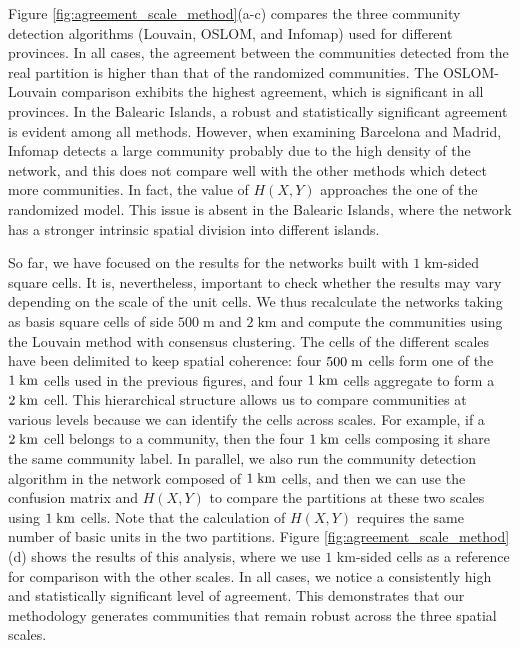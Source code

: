 Figure \ref{fig:agreement_scale_method}(a-c) compares the three community detection algorithms (Louvain, OSLOM, and Infomap) used for different provinces. In all cases, the agreement between the communities detected from the real partition is higher than that of the randomized communities. The OSLOM-Louvain comparison exhibits the highest agreement, which is significant in all provinces. In the Balearic Islands, a robust and statistically significant agreement is evident among all methods. However, when examining Barcelona and Madrid, Infomap detects a large community probably due to the high density of the network, and this does not compare well with the other methods which detect more communities. In fact, the value of $H(X,Y)$ approaches the one of the randomized model. This issue is absent in the Balearic Islands, where the network has a stronger intrinsic spatial division into different islands.

So far, we have focused on the results for the networks built with $1 \; \textrm{km}$-sided square cells. It is, nevertheless, important to check whether the results may vary depending on the scale of the unit cells. We thus recalculate the networks taking as basis square cells of side $500 \; \textrm{m}$ and $2 \; \textrm{km}$ and compute the communities using the Louvain method with consensus clustering. 
The cells of the different scales have been delimited to keep spatial coherence: four $500 \;\rm{m}$ cells form one of the $1  \;\rm{km}$ cells used in the previous figures, and four $1 \; \rm{km}$ cells aggregate to form a $2 \; \rm{km}$ cell. 
This hierarchical structure allows us to compare communities at various levels because we can identify the cells across scales. For example, if a $2 \;\rm{ km}$ cell belongs to a community, then the four $1 \;\rm{ km}$ cells composing it share the same community label.
In parallel, we also run the community detection algorithm in the network composed of $1 \; \rm{ km}$ cells, and then we can use the confusion matrix and $H(X,Y)$ to compare the partitions at these two scales using $1 \;\rm{ km}$ cells. Note that the calculation of $H(X,Y)$ requires the same number of basic units in the two partitions. Figure \ref{fig:agreement_scale_method}(d) shows the results of this analysis, where we use $1$ km-sided cells as a reference for comparison with the other scales. In all cases, we notice a consistently high and statistically significant level of agreement. This demonstrates that our methodology generates communities that remain robust across the three spatial scales.

